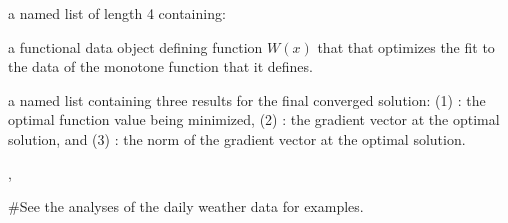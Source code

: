\begin{Value}
a named list of length 4 containing:

\begin{ldescription}
\item[\code{Wfdobj}] a functional data object defining function $W(x)$ that that
optimizes the fit to the data of the monotone function that it
defines.

\item[\code{Flist}] a named list containing three results for the final converged
solution: (1) : the optimal function value being minimized,
(2) : the gradient vector at the optimal solution, and
(3) : the norm of the gradient vector at the optimal
solution.

\end{ldescription}
\end{Value}
\begin{SeeAlso}\relax
{},
\end{SeeAlso}
\begin{Examples}
\begin{ExampleCode}
#See the analyses of the daily weather data for examples.
\end{ExampleCode}
\end{Examples}

